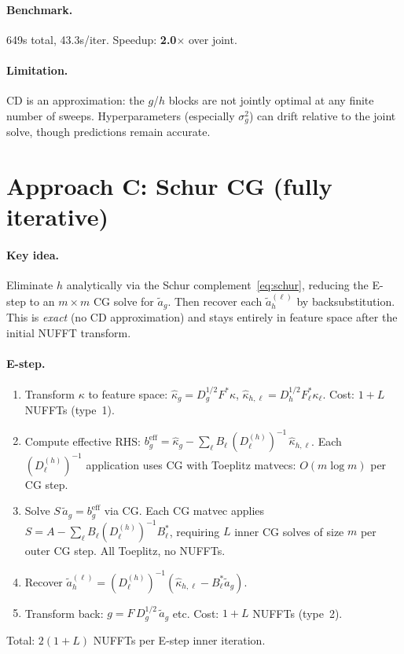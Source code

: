 \documentclass[11pt]{article}
\begin{document}
\paragraph{Benchmark.} 649s total, 43.3s/iter.
Speedup: \textbf{2.0$\times$} over joint.

\paragraph{Limitation.} CD is an approximation: the $g$/$h$ blocks
are not jointly optimal at any finite number of sweeps.
Hyperparameters (especially $\sigma_g^2$) can drift relative to
the joint solve, though predictions remain accurate.

\section{Approach C: Schur CG (fully iterative)}

\paragraph{Key idea.} Eliminate $h$ analytically via the Schur
complement~\eqref{eq:schur}, reducing the E-step to an $m{\times}m$
CG solve for $\tilde a_g$. Then recover each $\tilde a_h^{(\ell)}$
by backsubstitution. This is \emph{exact} (no CD approximation)
and stays entirely in feature space after the initial NUFFT transform.

\paragraph{E-step.}
\begin{enumerate}
\item Transform $\kappa$ to feature space:
  $\hat\kappa_g = D_g^{1/2} F^* \kappa$, \;
  $\hat\kappa_{h,\ell} = D_h^{1/2} F_\ell^* \kappa_\ell$.
  Cost: $1{+}L$ NUFFTs (type~1).
\item Compute effective RHS:
  $b_g^{\text{eff}} = \hat\kappa_g
    - \sum_\ell B_\ell\,(D_\ell^{(h)})^{-1}\,\hat\kappa_{h,\ell}$.
  Each $(D_\ell^{(h)})^{-1}$ application uses CG with Toeplitz
  matvecs: $O(m\log m)$ per CG step.
\item Solve $S\,\tilde a_g = b_g^{\text{eff}}$ via CG.
  Each CG matvec applies $S = A - \sum_\ell B_\ell (D_\ell^{(h)})^{-1} B_\ell^*$,
  requiring $L$ inner CG solves of size $m$ per outer CG step.
  All Toeplitz, no NUFFTs.
\item Recover $\tilde a_h^{(\ell)}
  = (D_\ell^{(h)})^{-1}(\hat\kappa_{h,\ell} - B_\ell^* \tilde a_g)$.
\item Transform back: $g = F\,D_g^{1/2}\,\tilde a_g$ etc.
  Cost: $1{+}L$ NUFFTs (type~2).
\end{enumerate}
Total: $2(1{+}L)$ NUFFTs per E-step inner iteration.
\end{document}
